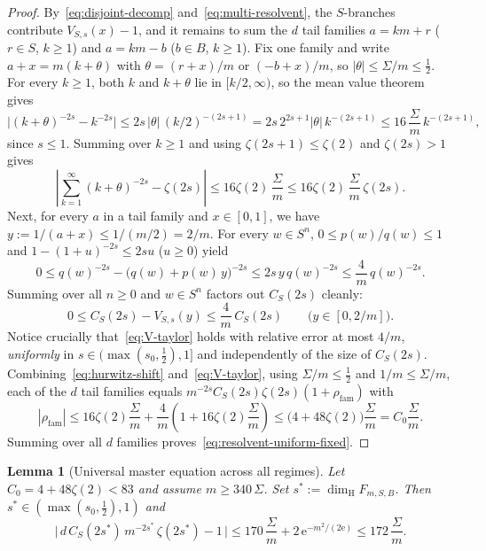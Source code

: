 \documentclass[11pt]{article}
\newtheorem{lemma}[theorem]{Lemma}
\theoremstyle{definition}
\theoremstyle{remark}
\newcommand{\ee}{\mathrm{e}}
\newcommand{\dimH}{\dim_{\mathrm{H}}}
\begin{document}
\begin{proof}
By~\eqref{eq:disjoint-decomp} and~\eqref{eq:multi-resolvent}, the $S$-branches
contribute $V_{S,s}(x)-1$, and it remains to sum the $d$ tail families
$a=km+r$ ($r\in S$, $k\ge1$) and $a=km-b$ ($b\in B$, $k\ge1$). Fix one family
and write $a+x=m(k+\theta)$ with $\theta=(r+x)/m$ or $(-b+x)/m$, so
$|\theta|\le\Sigma/m\le\frac12$. For every $k\ge1$, both $k$ and $k+\theta$
lie in $[k/2,\infty)$, so the mean value theorem gives
\[
\bigl|(k+\theta)^{-2s}-k^{-2s}\bigr|
\le 2s\,|\theta|\,(k/2)^{-(2s+1)}
=2s\,2^{2s+1}|\theta|\,k^{-(2s+1)}
\le 16\,\frac{\Sigma}{m}\,k^{-(2s+1)},
\]
since $s\le 1$. Summing over $k\ge1$ and using $\zeta(2s+1)\le\zeta(2)$ and
$\zeta(2s)>1$ gives
\begin{equation}\label{eq:hurwitz-shift}
\left|\sum_{k=1}^\infty(k+\theta)^{-2s}-\zeta(2s)\right|
\le 16\zeta(2)\,\frac{\Sigma}{m}
\le 16\zeta(2)\,\frac{\Sigma}{m}\,\zeta(2s).
\end{equation}
Next, for every $a$ in a tail family and $x\in[0,1]$, we have
$y:=1/(a+x)\le 1/(m/2)=2/m$. For every $w\in S^n$, $0\le p(w)/q(w)\le 1$ and
$1-(1+u)^{-2s}\le 2su$ ($u\ge0$) yield
\[
0\le q(w)^{-2s}-\bigl(q(w)+p(w)\,y\bigr)^{-2s}
\le 2s\,y\,q(w)^{-2s}
\le \frac{4}{m}\,q(w)^{-2s}.
\]
Summing over all $n\ge0$ and $w\in S^n$ factors out $C_S(2s)$ cleanly:
\begin{equation}\label{eq:V-taylor}
0\le C_S(2s)-V_{S,s}(y)\le \frac{4}{m}\,C_S(2s)
\qquad\bigl(y\in[0,2/m]\bigr).
\end{equation}
Notice crucially that~\eqref{eq:V-taylor} holds with relative error at most
$4/m$, \emph{uniformly} in $s\in(\max(s_0,\frac12),1]$ and independently of
the size of $C_S(2s)$. Combining~\eqref{eq:hurwitz-shift} and~\eqref{eq:V-taylor},
using $\Sigma/m\le\frac12$ and $1/m\le\Sigma/m$, each of the $d$ tail
families equals $m^{-2s}C_S(2s)\zeta(2s)(1+\rho_{\mathrm{fam}})$ with
\[
|\rho_{\mathrm{fam}}|
\le 16\zeta(2)\frac{\Sigma}{m}
+\frac{4}{m}\left(1+16\zeta(2)\frac{\Sigma}{m}\right)
\le \bigl(4+48\zeta(2)\bigr)\frac{\Sigma}{m}=C_0\frac{\Sigma}{m}.
\]
Summing over all $d$ families proves~\eqref{eq:resolvent-uniform-fixed}.
\end{proof}

\begin{lemma}[Universal master equation across all regimes]\label{lem:master}
Let $C_0=4+48\zeta(2)<83$ and assume $m\ge 340\,\Sigma$. Set
$s^*:=\dimH F_{m,S,B}$. Then $s^*\in(\max(s_0,\frac12),1)$ and
\begin{equation}\label{eq:master-fixed}
\bigl|\,d\,C_S(2s^*)\,m^{-2s^*}\,\zeta(2s^*)-1\,\bigr|
\le 170\,\frac{\Sigma}{m}+2\,\ee^{-m^2/(2\ee)}
\le 172\,\frac{\Sigma}{m}.
\end{equation}
\end{lemma}
\end{document}
